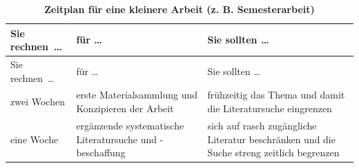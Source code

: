 \documentclass[]{book}
\theoremstyle{definition}
\theoremstyle{definition}
\theoremstyle{definition}
\theoremstyle{remark}
\begin{document}
\begin{longtable}[]{@{}lll@{}}
\caption{\textbf{\label{tab:zeitplan-klein} Zeitplan für eine kleinere
Arbeit (z. B. Semesterarbeit)}}\tabularnewline
\toprule
\begin{minipage}[b]{0.14\columnwidth}\raggedright\strut
Sie rechnen~\ldots{}\strut
\end{minipage} & \begin{minipage}[b]{0.40\columnwidth}\raggedright\strut
für \ldots{}\strut
\end{minipage} & \begin{minipage}[b]{0.37\columnwidth}\raggedright\strut
Sie sollten \ldots{}\strut
\end{minipage}\tabularnewline
\midrule
\endfirsthead
\toprule
\begin{minipage}[b]{0.14\columnwidth}\raggedright\strut
Sie rechnen~\ldots{}\strut
\end{minipage} & \begin{minipage}[b]{0.40\columnwidth}\raggedright\strut
für \ldots{}\strut
\end{minipage} & \begin{minipage}[b]{0.37\columnwidth}\raggedright\strut
Sie sollten \ldots{}\strut
\end{minipage}\tabularnewline
\midrule
\endhead
\begin{minipage}[t]{0.14\columnwidth}\raggedright\strut
zwei Wochen\strut
\end{minipage} & \begin{minipage}[t]{0.40\columnwidth}\raggedright\strut
erste Materialsammlung und Konzipieren der Arbeit\strut
\end{minipage} & \begin{minipage}[t]{0.37\columnwidth}\raggedright\strut
frühzeitig das Thema und damit die Literatursuche
eingrenzen\vspace{5mm}\strut
\end{minipage}\tabularnewline
\begin{minipage}[t]{0.14\columnwidth}\raggedright\strut
eine Woche\strut
\end{minipage} & \begin{minipage}[t]{0.40\columnwidth}\raggedright\strut
ergänzende systematische Literatursuche und -beschaffung\strut
\end{minipage} & \begin{minipage}[t]{0.37\columnwidth}\raggedright\strut
sich auf rasch zugängliche Literatur beschränken und die Suche streng
zeitlich begrenzen\vspace{5mm}\strut

\end{minipage}
\end{longtable}
\end{document}
